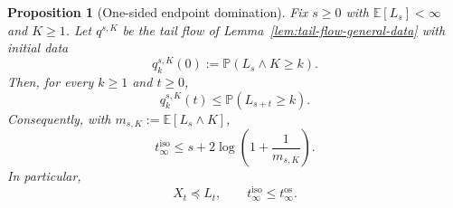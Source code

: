 \documentclass[10pt,a4paper]{amsart}
\newtheorem{proposition}{Proposition}
\begin{document}
\begin{proposition}[One-sided endpoint domination]
\label{prop:isotropic-endpoint-domination}
Fix $s\geq0$ with $\mathbb E[L_s]<\infty$ and $K\geq1$. Let
$q^{s,K}$ be the tail flow of Lemma~\ref{lem:tail-flow-general-data}
with initial data
\[
q_k^{s,K}(0)
:=
\mathbb P(L_s\wedge K\geq k).
\]
Then, for every $k\geq1$ and $t\geq0$,
\begin{equation}
\label{eq:isotropic-endpoint-domination}
q_k^{s,K}(t)
\leq
\mathbb P(L_{s+t}\geq k).
\end{equation}
Consequently, with $m_{s,K}:=\mathbb E[L_s\wedge K]$,
\begin{equation}
\label{eq:isotropic-explosion-upper}
t_{\infty}^{\mathrm{iso}}
\leq
s+2\log\left(1+\frac1{m_{s,K}}\right).
\end{equation}
In particular,
\begin{equation}
\label{eq:isotropic-one-sided-threshold-comparison}
X_t\preceq L_t,
\qquad
t_{\infty}^{\mathrm{iso}}
\leq t_{\infty}^{\mathrm{os}}.
\end{equation}
\end{proposition}
\end{document}
